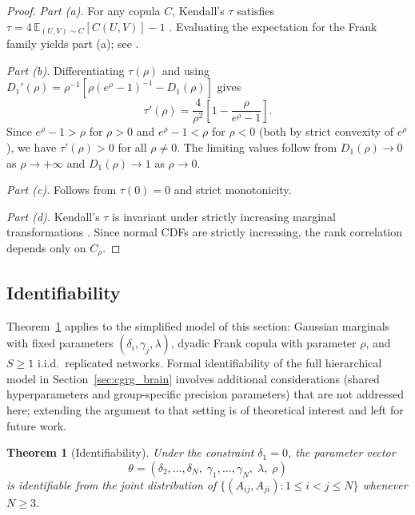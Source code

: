 \documentclass[12pt]{article}
\newtheorem{theorem}{Theorem}[section]
\begin{document}
\begin{proof}
\emph{Part (a).} For any copula $C$, Kendall's $\tau$ satisfies
$\tau = 4\,\mathbb{E}_{(U,V) \sim C}[C(U,V)] - 1$ \citep[Theorem
5.1.3]{nelsen}.  Evaluating the expectation for the Frank family yields
part (a); see \citet[Section~5.3]{joe}.

\emph{Part (b).} Differentiating $\tau(\rho)$ and using
$D_1'(\rho) = \rho^{-1}[\rho(e^\rho-1)^{-1} - D_1(\rho)]$ gives
\[
\tau'(\rho)
  = \frac{4}{\rho^2}\!\left[1 - \frac{\rho}{e^\rho - 1}\right].
\]
Since $e^\rho - 1 > \rho$ for $\rho > 0$ and $e^\rho - 1 < \rho$ for
$\rho < 0$ (both by strict convexity of $e^\rho$), we have
$\tau'(\rho) > 0$ for all $\rho \neq 0$.  The limiting values follow
from $D_1(\rho) \to 0$ as $\rho \to +\infty$ and $D_1(\rho) \to 1$ as
$\rho \to 0$.

\emph{Part (c).} Follows from $\tau(0) = 0$ and strict monotonicity.

\emph{Part (d).} Kendall's $\tau$ is invariant under strictly increasing
marginal transformations \citep[Theorem~5.1.9]{nelsen}.  Since normal CDFs
are strictly increasing, the rank correlation depends only on $C_\rho$.
\end{proof}

\subsection{Identifiability}

Theorem~\ref{thm:ident} applies to the simplified model of this section:
Gaussian marginals with fixed parameters $(\delta_i, \gamma_j, \lambda)$,
dyadic Frank copula with parameter $\rho$, and $S \geq 1$ i.i.d.\ replicated
networks.  Formal identifiability of the full hierarchical model in
Section~\ref{sec:cgrg_brain} involves additional considerations
(shared hyperparameters and group-specific precision parameters) that
are not addressed here; extending the argument to that setting is of
theoretical interest and left for future work.

\begin{theorem}[Identifiability]
\label{thm:ident}
Under the constraint $\delta_1 = 0$, the parameter vector
\[
\theta = (\delta_2, \ldots, \delta_N,\; \gamma_1, \ldots, \gamma_N,\;
          \lambda,\; \rho)
\]
is identifiable from the joint distribution of
$\{(A_{ij}, A_{ji}) : 1 \leq i < j \leq N\}$ whenever $N \geq 3$.
\end{theorem}
\end{document}
